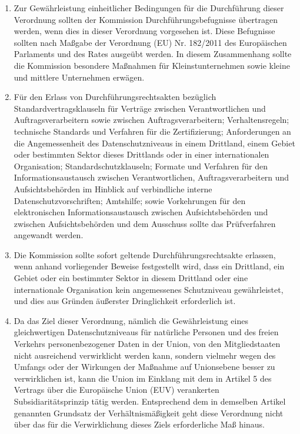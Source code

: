 \begin{enumerate}

   \item Zur Gewährleistung einheitlicher Bedingungen für die Durchführung dieser Verordnung sollten der Kommission
    Durchführungsbefugnisse übertragen werden, wenn dies in dieser Verordnung vorgesehen ist. Diese Befugnisse sollten
    nach Maßgabe der Verordnung (EU) Nr. 182/2011 des Europäischen Parlaments und des Rates ausgeübt werden. In diesem
    Zusammenhang sollte die Kommission besondere Maßnahmen für Kleinstunternehmen sowie kleine und mittlere Unternehmen
    erwägen.%
   \label{itm:eg-167}
   

   \item Für den Erlass von Durchführungsrechtsakten bezüglich Standardvertragsklauseln für Verträge zwischen
    Verantwortlichen und Auftragsverarbeitern sowie zwischen Auftragsverarbeitern; Verhaltensregeln; technische
    Standards und Verfahren für die Zertifizierung; Anforderungen an die Angemessenheit des Datenschutzniveaus in einem
    Drittland, einem Gebiet oder bestimmten Sektor dieses Drittlands oder in einer internationalen Organisation;
    Standardschutzklauseln; Formate und Verfahren für den Informationsaustausch zwischen Verantwortlichen,
    Auftragsverarbeitern und Aufsichtsbehörden im Hinblick auf verbindliche interne Datenschutzvorschriften; Amtshilfe;
    sowie Vorkehrungen für den elektronischen Informationsaustausch zwischen Aufsichtsbehörden und zwischen
    Aufsichtsbehörden und dem Ausschuss sollte das Prüfverfahren angewandt werden.%
   \label{itm:eg-168}
   

   \item Die Kommission sollte sofort geltende Durchführungsrechtsakte erlassen, wenn anhand vorliegender Beweise
    festgestellt wird, dass ein Drittland, ein Gebiet oder ein bestimmter Sektor in diesem Drittland oder eine
    internationale Organisation kein angemessenes Schutzniveau gewährleistet, und dies aus Gründen äußerster
    Dringlichkeit erforderlich ist.%
   \label{itm:eg-169}
   

   \item Da das Ziel dieser Verordnung, nämlich die Gewährleistung eines gleichwertigen Datenschutzniveaus für
    natürliche Personen und des freien Verkehrs personenbezogener Daten in der Union, von den Mitgliedstaaten nicht
    ausreichend verwirklicht werden kann, sondern vielmehr wegen des Umfangs oder der Wirkungen der Maßnahme auf
    Unionsebene besser zu verwirklichen ist, kann die Union im Einklang mit dem in Artikel 5 des Vertrags über die
    Europäische Union (EUV) verankerten Subsidiaritätsprinzip tätig werden. Entsprechend dem in demselben Artikel
    genannten Grundsatz der Verhältnismäßigkeit geht diese Verordnung nicht über das für die Verwirklichung dieses
    Ziels erforderliche Maß hinaus.%
   \label{itm:eg-170}
   

\end{enumerate}
